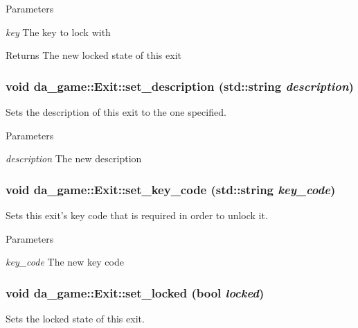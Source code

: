 \begin{DoxyParams}{Parameters}
\item[{\em key}]The key to lock with \end{DoxyParams}
\begin{DoxyReturn}{Returns}
The new locked state of this exit 
\end{DoxyReturn}
\hypertarget{classda__game_1_1Exit_aef620aed29423172be98f0e2bc12db13}{
\subsubsection[{set\_\-description}]{\setlength{\rightskip}{0pt plus 5cm}void da\_\-game::Exit::set\_\-description (std::string {\em description})}}
\label{classda__game_1_1Exit_aef620aed29423172be98f0e2bc12db13}
Sets the description of this exit to the one specified.


\begin{DoxyParams}{Parameters}
\item[{\em description}]The new description \end{DoxyParams}
\hypertarget{classda__game_1_1Exit_ad79677f119a5d06a6d4a9185c710ab73}{
\subsubsection[{set\_\-key\_\-code}]{\setlength{\rightskip}{0pt plus 5cm}void da\_\-game::Exit::set\_\-key\_\-code (std::string {\em key\_\-code})}}
\label{classda__game_1_1Exit_ad79677f119a5d06a6d4a9185c710ab73}
Sets this exit's key code that is required in order to unlock it.


\begin{DoxyParams}{Parameters}
\item[{\em key\_\-code}]The new key code \end{DoxyParams}
\hypertarget{classda__game_1_1Exit_a48bfb84dc93e05cb9f43d9d87726b8f5}{
\subsubsection[{set\_\-locked}]{\setlength{\rightskip}{0pt plus 5cm}void da\_\-game::Exit::set\_\-locked (bool {\em locked})}}
\label{classda__game_1_1Exit_a48bfb84dc93e05cb9f43d9d87726b8f5}
Sets the locked state of this exit.



